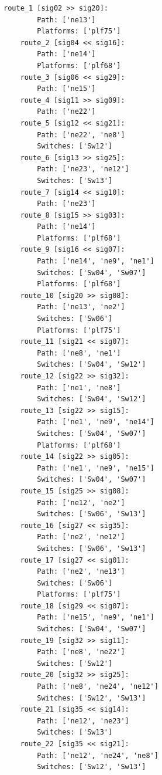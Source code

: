 	\begin{lstlisting}[language = {}, caption = Routes.RNA, label = {lst:EJ1_7}]
	route_1 [sig02 >> sig20]:
		Path: ['ne13']
		Platforms: ['plf75']
	route_2 [sig04 << sig16]:
		Path: ['ne14']
		Platforms: ['plf68']
	route_3 [sig06 << sig29]:
		Path: ['ne15']
	route_4 [sig11 >> sig09]:
		Path: ['ne22']
	route_5 [sig12 << sig21]:
		Path: ['ne22', 'ne8']
		Switches: ['Sw12']
	route_6 [sig13 >> sig25]:
		Path: ['ne23', 'ne12']
		Switches: ['Sw13']
	route_7 [sig14 << sig10]:
		Path: ['ne23']
	route_8 [sig15 >> sig03]:
		Path: ['ne14']
		Platforms: ['plf68']
	route_9 [sig16 << sig07]:
		Path: ['ne14', 'ne9', 'ne1']
		Switches: ['Sw04', 'Sw07']
		Platforms: ['plf68']
	route_10 [sig20 >> sig08]:
		Path: ['ne13', 'ne2']
		Switches: ['Sw06']
		Platforms: ['plf75']
	route_11 [sig21 << sig07]:
		Path: ['ne8', 'ne1']
		Switches: ['Sw04', 'Sw12']
	route_12 [sig22 >> sig32]:
		Path: ['ne1', 'ne8']
		Switches: ['Sw04', 'Sw12']
	route_13 [sig22 >> sig15]:
		Path: ['ne1', 'ne9', 'ne14']
		Switches: ['Sw04', 'Sw07']
		Platforms: ['plf68']
	route_14 [sig22 >> sig05]:
		Path: ['ne1', 'ne9', 'ne15']
		Switches: ['Sw04', 'Sw07']
	route_15 [sig25 >> sig08]:
		Path: ['ne12', 'ne2']
		Switches: ['Sw06', 'Sw13']
	route_16 [sig27 << sig35]:
		Path: ['ne2', 'ne12']
		Switches: ['Sw06', 'Sw13']
	route_17 [sig27 << sig01]:
		Path: ['ne2', 'ne13']
		Switches: ['Sw06']
		Platforms: ['plf75']
	route_18 [sig29 << sig07]:
		Path: ['ne15', 'ne9', 'ne1']
		Switches: ['Sw04', 'Sw07']
	route_19 [sig32 >> sig11]:
		Path: ['ne8', 'ne22']
		Switches: ['Sw12']
	route_20 [sig32 >> sig25]:
		Path: ['ne8', 'ne24', 'ne12']
		Switches: ['Sw12', 'Sw13']
	route_21 [sig35 << sig14]:
		Path: ['ne12', 'ne23']
		Switches: ['Sw13']
	route_22 [sig35 << sig21]:
		Path: ['ne12', 'ne24', 'ne8']
		Switches: ['Sw12', 'Sw13']
	\end{lstlisting}